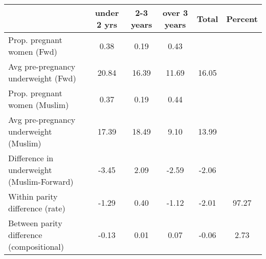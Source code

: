 \begin{tabular}{l*{5}{c}}
\toprule
            &\multicolumn{1}{c}{under 2 yrs}&\multicolumn{1}{c}{2-3 years}&\multicolumn{1}{c}{over 3 years}&\multicolumn{1}{c}{Total}&\multicolumn{1}{c}{Percent}\\
\midrule
\midrule
Prop. pregnant women (Fwd)&        0.38&        0.19&        0.43&            &            \\
Avg pre-pregnancy underweight (Fwd)&       20.84&       16.39&       11.69&       16.05&            \\
Prop. pregnant women (Muslim)&        0.37&        0.19&        0.44&            &            \\
Avg pre-pregnancy underweight (Muslim)&       17.39&       18.49&        9.10&       13.99&            \\
Difference in underweight (Muslim-Forward)&       -3.45&        2.09&       -2.59&       -2.06&            \\
Within parity difference (rate)&       -1.29&        0.40&       -1.12&       -2.01&       97.27\\
Between parity difference (compositional)&       -0.13&        0.01&        0.07&       -0.06&        2.73\\
\bottomrule
\end{tabular}
